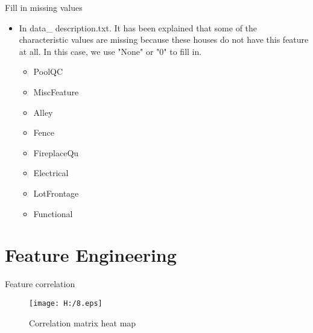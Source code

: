 \documentclass[
 size=14pt,
 paper=smartboard,  %
 mode=present, 		%
 display=slides, 	%
 style=tuliplab,  	%
 pauseslide,
 fleqn,leqno]{powerdot}
\begin{document}
\begin{slide}[toc=,bm=]{Fill in missing values}
  \begin{itemize}
  \item
  In data_ description.txt. It has been explained that some of the characteristic values are missing because these houses do not have this feature at all. In this case, we use "None" or "0" to fill in.
  \begin{itemize}
  \item
  PoolQC
  \item
  MiscFeature
  \item
  Alley
  \item
  Fence
  \item
  FireplaceQu
  \item Electrical
  \item
  LotFrontage
  \item
  Functional
  \end{itemize}
  \end{itemize}
  
  
  \end{slide}



\section{Feature Engineering}


\begin{slide}{Feature correlation}
    
  \begin{figure}
    \texttt{[image: H:/8.eps]}
    \caption{Correlation matrix heat map}
    \label{fig:8}
  \end{figure}
  
  \end{slide}
\end{document}
